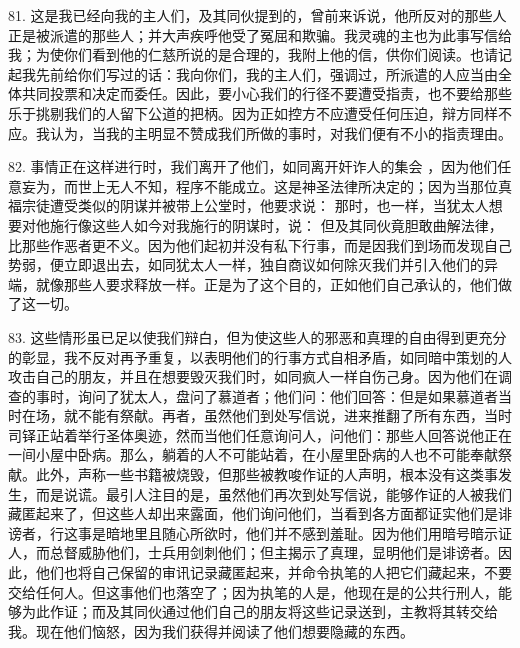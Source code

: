 81. 这是我已经向我的主人们，及其同伙提到的，曾前来诉说，他所反对的那些人正是被派遣的那些人；并大声疾呼他受了冤屈和欺骗。我灵魂的主也为此事写信给我；为使你们看到他的仁慈所说的是合理的，我附上他的信，供你们阅读。也请记起我先前给你们写过的话：我向你们，我的主人们，强调过，所派遣的人应当由全体共同投票和决定而委任。因此，要小心我们的行径不要遭受指责，也不要给那些乐于挑剔我们的人留下公道的把柄。因为正如控方不应遭受任何压迫，辩方同样不应。我认为，当我的主明显不赞成我们所做的事时，对我们便有不小的指责理由。\par

82. 事情正在这样进行时，我们离开了他们，如同离开奸诈人的集会 ，因为他们任意妄为，而世上无人不知，程序不能成立。这是神圣法律所决定的；因为当那位真福宗徒遭受类似的阴谋并被带上公堂时，他要求说： 那时，也一样，当犹太人想要对他施行像这些人如今对我施行的阴谋时，说： 但及其同伙竟胆敢曲解法律，比那些作恶者更不义。因为他们起初并没有私下行事，而是因我们到场而发现自己势弱，便立即退出去，如同犹太人一样，独自商议如何除灭我们并引入他们的异端，就像那些人要求释放一样。正是为了这个目的，正如他们自己承认的，他们做了这一切。\par

83. 这些情形虽已足以使我们辩白，但为使这些人的邪恶和真理的自由得到更充分的彰显，我不反对再予重复，以表明他们的行事方式自相矛盾，如同暗中策划的人攻击自己的朋友，并且在想要毁灭我们时，如同疯人一样自伤己身。因为他们在调查的事时，询问了犹太人，盘问了慕道者；他们问：他们回答：但是如果慕道者当时在场，就不能有祭献。再者，虽然他们到处写信说，进来推翻了所有东西，当时司铎正站着举行圣体奥迹，然而当他们任意询问人，问他们：那些人回答说他正在一间小屋中卧病。那么，躺着的人不可能站着，在小屋里卧病的人也不可能奉献祭献。此外，声称一些书籍被烧毁，但那些被教唆作证的人声明，根本没有这类事发生，而是说谎。最引人注目的是，虽然他们再次到处写信说，能够作证的人被我们藏匿起来了，但这些人却出来露面，他们询问他们，当看到各方面都证实他们是诽谤者，行这事是暗地里且随心所欲时，他们并不感到羞耻。因为他们用暗号暗示证人，而总督威胁他们，士兵用剑刺他们；但主揭示了真理，显明他们是诽谤者。因此，他们也将自己保留的审讯记录藏匿起来，并命令执笔的人把它们藏起来，不要交给任何人。但这事他们也落空了；因为执笔的人是，他现在是的公共行刑人，能够为此作证；而及其同伙通过他们自己的朋友将这些记录送到，主教将其转交给我。现在他们恼怒，因为我们获得并阅读了他们想要隐藏的东西。\par

